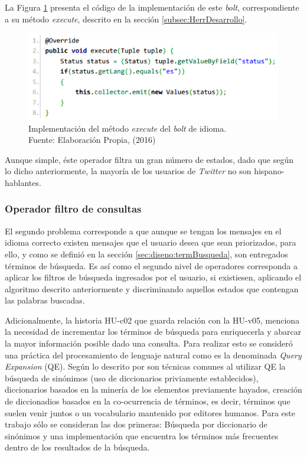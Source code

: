 La Figura \ref{fig:operadorIdioma} presenta el código de la implementación de este \textit{bolt}, correspondiente a su método \textit{execute}, descrito en la sección \ref{subsec:HerrDesarrollo}.

\begin{figure}[H]
	\centering
	\captionsetup{justification=centering}
	\includegraphics[scale=0.8]{images/LanguageBoltExecute.png}
	\caption[Implementación del método \textit{execute} del \textit{bolt} de idioma.]{Implementación del método \textit{execute} del \textit{bolt} de idioma.\\Fuente: Elaboración Propia, (2016)}
	\label{fig:operadorIdioma}
\end{figure}

Aunque simple, éste operador filtra un gran número de estados, dado que según lo dicho anteriormente, la mayoría de los usuarios de \textit{Twitter} no son hispano-hablantes. 

\subsubsection*{Operador filtro de consultas}
\label{subsubsec:2op}

El segundo problema corresponde a que aunque se tengan los mensajes en el idioma correcto existen mensajes que el usuario desea que sean priorizados, para ello, y como se definió en la sección \ref{sec:diseno:termBusqueda}, son entregados términos de búsqueda. Es así como el segundo nivel de operadores corresponda a aplicar los filtros de búsqueda ingresados por el usuario, si existiesen, aplicando el algoritmo descrito anteriormente y discriminando aquellos estados que contengan las palabras buscadas.

Adicionalmente, la historia HU-c02 que guarda relación con la HU-v05, menciona la necesidad de incrementar los términos de búsqueda para enriquecerla y abarcar la mayor información posible dado una consulta. Para realizar esto se consideró una práctica del procesamiento de lenguaje natural como es la denominada \textit{Query Expansion} (QE). Según lo descrito por \cite{IRQE} son técnicas comunes al utilizar QE la búsqueda de sinónimos (uso de diccionarios priviamente establecidos), diccionarios basados en la minería de los elementos previamente hayados, creación de diccionadios basados en la co-ocurrencia de términos, es decir, términos que suelen venir juntos o un vocabulario mantenido por editores humanos. Para este trabajo sólo se consideran las dos primeras: Búsqueda por diccionario de sinónimos y una implementación que encuentra los términos más frecuentes dentro de los resultados de la búsqueda.

